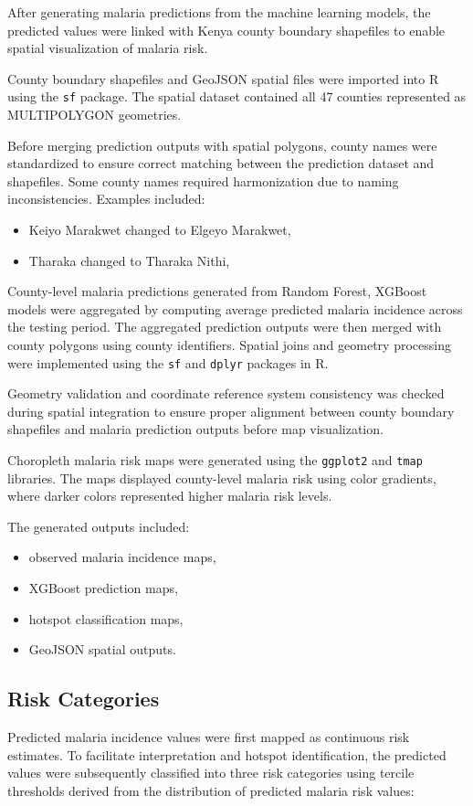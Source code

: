 	
	After generating malaria predictions from the machine learning models, the predicted values were linked with Kenya county boundary shapefiles to enable spatial visualization of malaria risk.
	
	County boundary shapefiles and GeoJSON spatial files were imported into R using the \texttt{sf} package. The spatial dataset contained all 47 counties represented as MULTIPOLYGON geometries.
	
	Before merging prediction outputs with spatial polygons, county names were standardized to ensure correct matching between the prediction dataset and shapefiles. Some county names required harmonization due to naming inconsistencies. Examples included:
	
	\begin{itemize}
		\item Keiyo Marakwet changed to Elgeyo Marakwet,
		\item Tharaka changed to Tharaka Nithi,
	\end{itemize}
	
	County-level malaria predictions generated from Random Forest, XGBoost models were aggregated by computing average predicted malaria incidence across the testing period. The aggregated prediction outputs were then merged with county polygons using county identifiers. Spatial joins and geometry processing were implemented using the \texttt{sf} and \texttt{dplyr} packages in R.
	
	Geometry validation and coordinate reference system consistency was checked during spatial integration to ensure proper alignment between county boundary shapefiles and malaria prediction outputs before map visualization.
	
	
	Choropleth malaria risk maps were generated using the \texttt{ggplot2} and \texttt{tmap} libraries. The maps displayed county-level malaria risk using color gradients, where darker colors represented higher malaria risk levels.
	
	The generated outputs included:
	\begin{itemize}
		\item observed malaria incidence maps,
		\item XGBoost prediction maps,
		\item hotspot classification maps,
		\item GeoJSON spatial outputs.
	\end{itemize}
	
	
	\subsection{Risk Categories}
	 Predicted malaria incidence values were first mapped as continuous risk estimates. To facilitate interpretation and hotspot identification, the predicted values were subsequently classified into three risk categories using tercile thresholds derived from the distribution of predicted malaria risk values:
	
